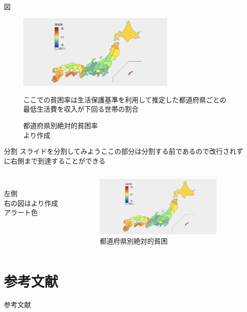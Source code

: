 \documentclass[aspectratio=169, dvipdfmx, 12pt,uplatex]{beamer} %
\newcommand{\Aka}[1]{\textcolor{Akadaidai}{#1}}
\begin{document}
\begin{frame}{図}
  \begin{figure}[H]
  \centering
  \includegraphics[width=0.7\textwidth]{absolutePovertyRate.png}
  \caption{\label{fig:aPR}都道府県別絶対的貧困率
  \\ \cite{戸室健作2013近年における都道府県別貧困率の推移について}より作成}
  ここでの貧困率は生活保護基準を利用して推定した都道府県ごとの最低生活費を収入が下回る世帯の割合
  \end{figure}
  \end{frame}
  \begin{frame}{分割}
     スライドを分割してみようここの部分は分割する前であるので改行されずに右側まで到達することができる
      \begin{columns}[t]
      \begin{column}{0.5\textwidth}
      \\
        左側\\
         \Aka{右の図は\cite{戸室健作2013近年における都道府県別貧困率の推移について}より作成}\\
         \alert{アラート色}
      \end{column}
      \begin{column}{0.5\textwidth}
        \begin{figure}
          \begin{center}
            \includegraphics[height=3.0cm]{absolutePovertyRate.png}
            \caption{都道府県別絶対的貧困}
          \end{center}
        \end{figure}
      \end{column}
    \end{columns}
  \end{frame}

 \section*{参考文献}
  \begin{frame}[allowframebreaks]{参考文献}{}
   \nocite{*}
   
   
  \end{frame}
\end{document}
